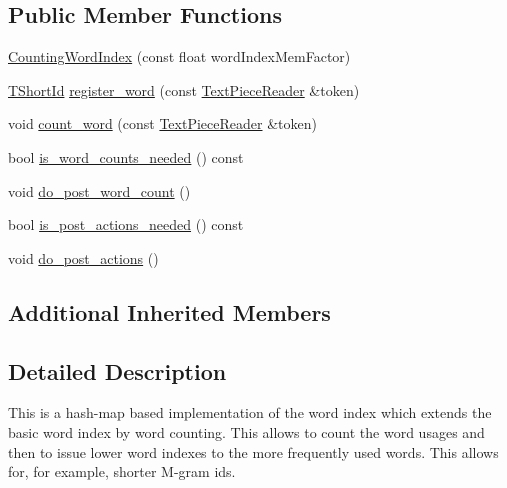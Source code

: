\subsection*{Public Member Functions}
\begin{DoxyCompactItemize}
\item 
\hyperlink{classuva_1_1smt_1_1tries_1_1dictionary_1_1_counting_word_index_a9ea376675b8173dea3f020be64debb32}{Counting\+Word\+Index} (const float word\+Index\+Mem\+Factor)
\item 
\hyperlink{namespaceuva_1_1smt_1_1hashing_adcf22e1982ad09d3a63494c006267469}{T\+Short\+Id} \hyperlink{classuva_1_1smt_1_1tries_1_1dictionary_1_1_counting_word_index_ad5bc99da9ce39756874767a6e5c25950}{register\+\_\+word} (const \hyperlink{classuva_1_1smt_1_1file_1_1_text_piece_reader}{Text\+Piece\+Reader} \&token)
\item 
void \hyperlink{classuva_1_1smt_1_1tries_1_1dictionary_1_1_counting_word_index_a04de92d19cf3e624591be0dfd6ce70d2}{count\+\_\+word} (const \hyperlink{classuva_1_1smt_1_1file_1_1_text_piece_reader}{Text\+Piece\+Reader} \&token)
\item 
bool \hyperlink{classuva_1_1smt_1_1tries_1_1dictionary_1_1_counting_word_index_a04f3d5b496cea742af5cf87ed4ffd1ed}{is\+\_\+word\+\_\+counts\+\_\+needed} () const 
\item 
void \hyperlink{classuva_1_1smt_1_1tries_1_1dictionary_1_1_counting_word_index_afd30b984081fa5ad17df71d16b97601a}{do\+\_\+post\+\_\+word\+\_\+count} ()
\item 
bool \hyperlink{classuva_1_1smt_1_1tries_1_1dictionary_1_1_counting_word_index_aa6645a72c390f21fa6c2bd6710467940}{is\+\_\+post\+\_\+actions\+\_\+needed} () const 
\item 
void \hyperlink{classuva_1_1smt_1_1tries_1_1dictionary_1_1_counting_word_index_a4128c2af656310a7eb2d80650d10ffb4}{do\+\_\+post\+\_\+actions} ()
\end{DoxyCompactItemize}
\subsection*{Additional Inherited Members}


\subsection{Detailed Description}
This is a hash-\/map based implementation of the word index which extends the basic word index by word counting. This allows to count the word usages and then to issue lower word indexes to the more frequently used words. This allows for, for example, shorter M-\/gram ids. 

